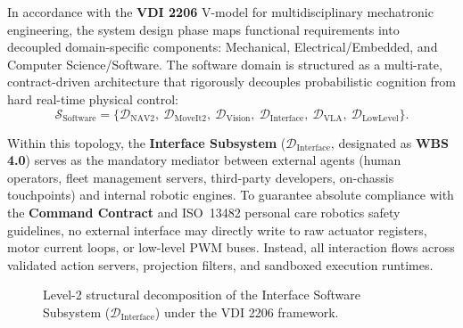 \documentclass[10pt,a4paper]{article}
\begin{document}
In accordance with the \textbf{VDI 2206} V-model for multidisciplinary mechatronic engineering, the system design phase maps functional requirements into decoupled domain-specific components: Mechanical, Electrical/Embedded, and Computer Science/Software. The software domain is structured as a multi-rate, contract-driven architecture that rigorously decouples probabilistic cognition from hard real-time physical control:
\begin{equation}
    \mathcal{S}_{\text{Software}} = \Big\{ \mathcal{D}_{\text{NAV2}}, \ \mathcal{D}_{\text{MoveIt2}}, \ \mathcal{D}_{\text{Vision}}, \ \mathcal{D}_{\text{Interface}}, \ \mathcal{D}_{\text{VLA}}, \ \mathcal{D}_{\text{LowLevel}} \Big\}.
\end{equation}

Within this topology, the \textbf{Interface Subsystem} ($\mathcal{D}_{\text{Interface}}$, designated as \textbf{WBS 4.0}) serves as the mandatory mediator between external agents (human operators, fleet management servers, third-party developers, on-chassis touchpoints) and internal robotic engines. To guarantee absolute compliance with the \textbf{Command Contract} and ISO~13482 personal care robotics safety guidelines, no external interface may directly write to raw actuator registers, motor current loops, or low-level PWM buses. Instead, all interaction flows across validated action servers, projection filters, and sandboxed execution runtimes.

\begin{figure}[htbp]
\centering
{}
\caption{Level-2 structural decomposition of the Interface Software Subsystem ($\mathcal{D}_{\text{Interface}}$) under the VDI 2206 framework.}
\label{fig:wbs_tree}
\end{figure}
\end{document}
